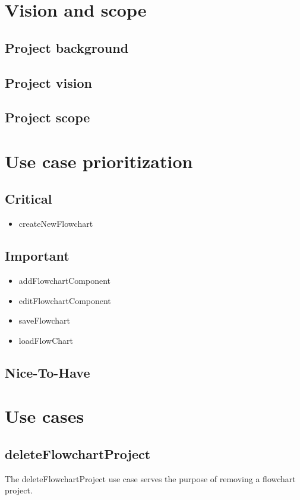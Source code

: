 \documentclass[11pt,a4paper,titlepage]{article}
\begin{document}


\tableofcontents
\pagebreak

\section{Vision and scope}
\subsection{Project background}
\subsection{Project vision}
\subsection{Project scope}



\newpage	
\section{Use case prioritization}
\subsection{Critical}
\begin{itemize}
  \item createNewFlowchart
\end{itemize}
\subsection{Important}
\begin{itemize}
  \item addFlowchartComponent
  \item editFlowchartComponent
  \item saveFlowchart
  \item loadFlowChart
\end{itemize}
\subsection{Nice-To-Have}

\newpage
\section{Use cases}
	
\subsection{deleteFlowchartProject}
The deleteFlowchartProject use case serves the purpose of removing a flowchart project.
\end{document}
